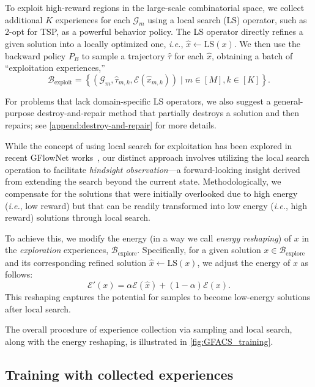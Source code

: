 \documentclass[twoside]{article}
\theoremstyle{plain}
\theoremstyle{definition}
\theoremstyle{remark}
\begin{document}
To exploit high-reward regions in the large-scale combinatorial space, we collect additional $K$ experiences for each $\mathcal{G}_m$ using a local search (LS) operator, such as 2-opt for TSP, as a powerful behavior policy. 
The LS operator directly refines a given solution into a locally optimized one, \textit{i.e.}, $\hat{x} \leftarrow \text{LS}(x)$. 
We then use the backward policy $P_B$ to sample a trajectory $\hat{\tau}$ for each $\hat{x}$, 
obtaining a batch of ``exploitation experiences,'' 
\begin{equation*}
\mathcal{B}_{\text{exploit}} = \left\{ \left( \mathcal{G}_m, \hat{\tau}_{m, k}, \mathcal{E}(\hat{x}_{m,k}) \right) \mid m \in [M], k \in [K] \right\}.
\end{equation*}

For problems that lack domain-specific LS operators, we also suggest a general-purpose destroy-and-repair method that partially destroys a solution and then repairs; see \cref{append:destroy-and-repair} for more details.


While the concept of using local search for exploitation has been explored in recent GFlowNet works~\citep{kim2023local}, our distinct approach involves utilizing the local search operation to facilitate \textit{hindsight observation}—a forward-looking insight derived from extending the search beyond the current state. Methodologically, we compensate for the solutions that were initially overlooked due to high energy (\textit{i.e.}, low reward) but that can be readily transformed into low energy (\textit{i.e.}, high reward) solutions through local search.

To achieve this, we modify the energy (in a way we call \textit{energy reshaping}) of $x$ in the \textit{exploration} experiences, $\mathcal{B}_{\text{explore}}$. Specifically, for a given solution $x\in\mathcal{B}_{\text{explore}}$ and its corresponding refined solution $\hat{x} \gets \text{LS}(x)$, we adjust the energy of $x$ as follows:
\begin{equation} \label{eq:energy_reshaping}
\mathcal{E}'(x) = \alpha \mathcal{E}(\hat{x}) + (1-\alpha) \mathcal{E}(x).
\end{equation}
This reshaping captures the potential for samples to become low-energy solutions after local search.

The overall procedure of experience collection via sampling and local search, along with the energy reshaping, is illustrated in \cref{fig:GFACS_training}.


\subsection{Training with collected experiences} \label{sec:stepB}
\end{document}
